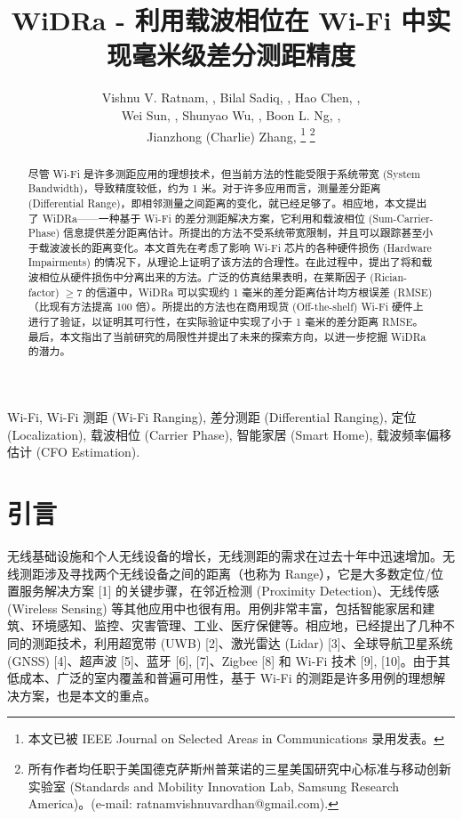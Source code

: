 \documentclass[journal]{IEEEtran}
\begin{document}
\title{WiDRa - 利用载波相位在 Wi-Fi 中实现毫米级差分测距精度}

\author{Vishnu V. Ratnam, , Bilal Sadiq, , Hao Chen, , \\
Wei Sun, , Shunyao Wu, , Boon L. Ng, , \\
Jianzhong (Charlie) Zhang, 
\thanks{本文已被 IEEE Journal on Selected Areas in Communications 录用发表。}
\thanks{所有作者均任职于美国德克萨斯州普莱诺的三星美国研究中心标准与移动创新实验室 (Standards and Mobility Innovation Lab, Samsung Research America)。(e-mail: ratnamvishnuvardhan@gmail.com).}
}

\maketitle

\begin{abstract}
尽管 Wi-Fi 是许多测距应用的理想技术，但当前方法的性能受限于系统带宽 (System Bandwidth)，导致精度较低，约为 1 米。对于许多应用而言，测量差分距离 (Differential Range)，即相邻测量之间距离的变化，就已经足够了。相应地，本文提出了 WiDRa——一种基于 Wi-Fi 的差分测距解决方案，它利用和载波相位 (Sum-Carrier-Phase) 信息提供差分距离估计。所提出的方法不受系统带宽限制，并且可以跟踪甚至小于载波波长的距离变化。本文首先在考虑了影响 Wi-Fi 芯片的各种硬件损伤 (Hardware Impairments) 的情况下，从理论上证明了该方法的合理性。在此过程中，提出了将和载波相位从硬件损伤中分离出来的方法。广泛的仿真结果表明，在莱斯因子 (Rician-factor) $\ge 7$ 的信道中，WiDRa 可以实现约 1 毫米的差分距离估计均方根误差 (RMSE)（比现有方法提高 100 倍）。所提出的方法也在商用现货 (Off-the-shelf) Wi-Fi 硬件上进行了验证，以证明其可行性，在实际验证中实现了小于 1 毫米的差分距离 RMSE。最后，本文指出了当前研究的局限性并提出了未来的探索方向，以进一步挖掘 WiDRa 的潜力。
\end{abstract}

\begin{IEEEkeywords}
Wi-Fi, Wi-Fi 测距 (Wi-Fi Ranging), 差分测距 (Differential Ranging), 定位 (Localization), 载波相位 (Carrier Phase), 智能家居 (Smart Home), 载波频率偏移估计 (CFO Estimation).
\end{IEEEkeywords}

\section{引言}
无线基础设施和个人无线设备的增长，无线测距的需求在过去十年中迅速增加。无线测距涉及寻找两个无线设备之间的距离（也称为 Range），它是大多数定位/位置服务解决方案 [1] 的关键步骤，在邻近检测 (Proximity Detection)、无线传感 (Wireless Sensing) 等其他应用中也很有用。用例非常丰富，包括智能家居和建筑、环境感知、监控、灾害管理、工业、医疗保健等。相应地，已经提出了几种不同的测距技术，利用超宽带 (UWB) [2]、激光雷达 (Lidar) [3]、全球导航卫星系统 (GNSS) [4]、超声波 [5]、蓝牙 [6], [7]、Zigbee [8] 和 Wi-Fi 技术 [9], [10]。由于其低成本、广泛的室内覆盖和普遍可用性，基于 Wi-Fi 的测距是许多用例的理想解决方案，也是本文的重点。
\end{document}
